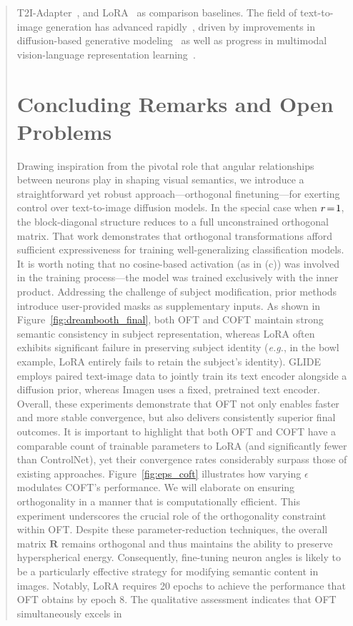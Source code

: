\begin{itemize}[leftmargin=*,nosep]
\begin{abstract}
T2I-Adapter~\cite{mou2023t2i}, and LoRA~\cite{hulora2022} as comparison baselines. The field of text-to-image generation has advanced rapidly~\cite{saharia2022photorealistic,ramesh2022hierarchical,rombach2022high,gu2022vector,nichol2022glide}, driven by improvements in diffusion-based generative modeling~\cite{ho2020denoising,song2021score,song2021denoising,dhariwal2021diffusion} as well as progress in multimodal vision-language representation learning~\cite{su2020vlbert,lu2019vilbert,radford2021learning,wang2021simvlm,li2022blip,li2023blip,alayrac2022flamingo,schuhmann2022laion}. \section{Concluding Remarks and Open Problems}

Drawing inspiration from the pivotal role that angular relationships between neurons play in shaping visual semantics, we introduce a straightforward yet robust approach—orthogonal finetuning—for exerting control over text-to-image diffusion models. In the special case when $\thickmuskip=2mu \medmuskip=2mu r=1$, the block-diagonal structure reduces to a full unconstrained orthogonal matrix. That work demonstrates that orthogonal transformations afford sufficient expressiveness for training well-generalizing classification models. It is worth noting that no cosine-based activation (as in (c)) was involved in the training process—the model was trained exclusively with the inner product. Addressing the challenge of subject modification, prior methods~\cite{avrahami2022blended,nichol2022glide} introduce user-provided masks as supplementary inputs. As shown in Figure~\ref{fig:dreambooth_final}, both OFT and COFT maintain strong semantic consistency in subject representation, whereas LoRA often exhibits significant failure in preserving subject identity (\emph{e.g.}, in the bowl example, LoRA entirely fails to retain the subject’s identity). GLIDE employs paired text-image data to jointly train its text encoder alongside a diffusion prior, whereas Imagen uses a fixed, pretrained text encoder. Overall, these experiments demonstrate that OFT not only enables faster and more stable convergence, but also delivers consistently superior final outcomes. It is important to highlight that both OFT and COFT have a comparable count of trainable parameters to LoRA (and significantly fewer than ControlNet), yet their convergence rates considerably surpass those of existing approaches. Figure~\ref{fig:eps_coft} illustrates how varying $\epsilon$ modulates COFT's performance. We will elaborate on ensuring orthogonality in a manner that is computationally efficient. This experiment underscores the crucial role of the orthogonality constraint within OFT. Despite these parameter-reduction techniques, the overall matrix $\bm{R}$ remains orthogonal and thus maintains the ability to preserve hyperspherical energy. Consequently, fine-tuning neuron angles is likely to be a particularly effective strategy for modifying semantic content in images. Notably, LoRA requires 20 epochs to achieve the performance that OFT obtains by epoch 8. The qualitative assessment indicates that OFT simultaneously excels in 
\end{abstract}
\end{itemize}
